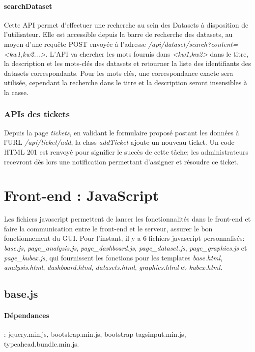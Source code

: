 \documentclass[a4paper]{report}
\begin{document}
\paragraph{searchDataset} Cette API permet d'effectuer une recherche au sein des Datasets à disposition de l'utilisateur. Elle est accessible depuis la barre de recherche des datasets, au moyen d'une requête POST envoyée à l'adresse \emph{/api/dataset/search?content=<kw1,kw2...>}. L'API va chercher les mots fournis dans \emph{<kw1,kw2>} dans le titre, la description et les mots-clés des datasets et retourner la liste des identifiants des datasets correspondants. Pour les mots clés, une correspondance exacte sera utilisée, cependant la recherche dans le titre et la description seront insensibles à la casse.

\subsubsection{APIs des tickets}
Depuis la page \emph{tickets}, en validant le formulaire proposé postant les données à l'URL \emph{/api/ticket/add}, la class \emph{addTicket} ajoute un nouveau ticket. Un code HTML 201 est renvoyé pour signifier le succès de cette tâche; les administrateurs recevront dès lors une notification permettant d'assigner et résoudre ce ticket.




\section{Front-end : JavaScript}
\label{sec:javascript}

Les fichiers javascript permettent de lancer les fonctionnalités dans le front-end et faire la communication entre le front-end et le serveur, assurer le bon fonctionnement du GUI. Pour l'instant, il y a 6 fichiers javascript personnalisés: \emph{base.js}, \emph{page\_analysis.js}, \emph{page\_dashboard.js}, \emph{page\_dataset.js}, \emph{page\_graphics.js} et \emph{page\_kubex.js}, qui fournissent les fonctions pour les templates \emph{base.html}, \emph{analysis.html}, \emph{dashboard.html}, \emph{datasets.html}, \emph{graphics.html} et \emph{kubex.html}. 

\subsection{base.js}

\paragraph{Dépendances} : jquery.min.js, bootstrap.min.js, bootstrap-tagsinput.min.js, typeahead.bundle.min.js.
\end{document}
